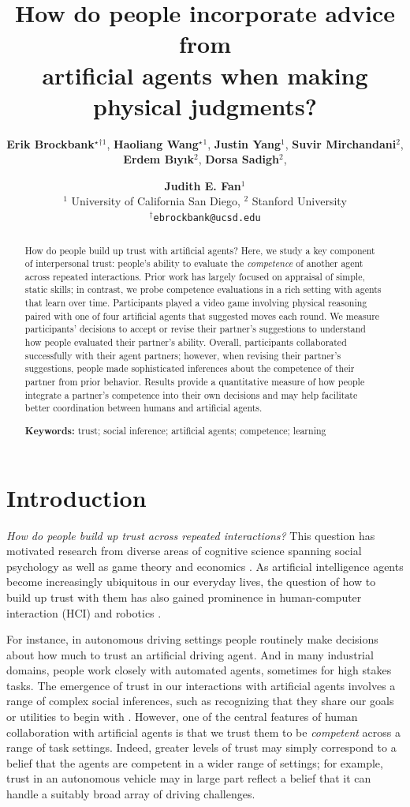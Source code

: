 \documentclass[10pt,letterpaper]{article}
\title{How do people incorporate advice from\\ artificial agents when making physical judgments?}
\author{
    {\large \bf Erik Brockbank$^{\star}$}$^{\dagger1}$, {\large \bf Haoliang Wang$^{\star}$}$^{1}$, {\large \bf Justin Yang}$^{1}$,
    {\large \bf Suvir Mirchandani}$^2$, \\
    {\large \bf Erdem B{\i}y{\i}k}$^{2}$, {\large \bf Dorsa Sadigh}$^{2}$, \and {\large \bf Judith E. Fan}$^1$ \\ 
    $^1$ University of California San Diego,
    $^2$ Stanford University \\
    $^{\dagger}$\texttt{ebrockbank@ucsd.edu}}
\begin{document}
\maketitle


\begin{abstract}
How do people build up trust with artificial agents? Here, we study a key component of interpersonal trust: people's ability to evaluate the \textit{competence} of another agent across repeated interactions. Prior work has largely focused on appraisal of simple, static skills; in contrast, we probe competence evaluations in a rich setting with agents that learn over time. Participants played a video game involving physical reasoning paired with one of four artificial agents that suggested moves each round. We measure participants' decisions to accept or revise their partner's suggestions to understand how people evaluated their partner's ability. Overall, participants collaborated successfully with their agent partners; however, when revising their partner's suggestions, people made sophisticated inferences about the competence of their partner from prior behavior. Results provide a quantitative measure of how people integrate a partner's competence into their own decisions and may help facilitate better coordination between humans and artificial agents.

\textbf{Keywords:} 
trust; social inference; artificial agents; competence; learning 
\end{abstract}



\section{Introduction}

\textit{How do people build up trust across repeated interactions?} This question has motivated research from diverse areas of cognitive science spanning social psychology \cite{simpson2007psychological, deutsch1973resolution} as well as game theory and economics \cite{camerer1988experimental, berg1995trust}. As artificial intelligence agents become increasingly ubiquitous in our everyday lives, the question of how to build up trust with them has also gained prominence in human-computer interaction (HCI) and robotics \cite{soh2020multi, chen2020trust}. 

For instance, in autonomous driving settings people routinely make decisions about how much to trust an artificial driving agent. And in many industrial domains, people work closely with automated agents, sometimes for high stakes tasks. The emergence of trust in our interactions with artificial agents involves a range of complex social inferences, such as recognizing that they share our goals or utilities to begin with \cite{serrino2019finding}. However, one of the central features of human collaboration with artificial agents is that we trust them to be \textit{competent} across a range of task settings. Indeed, greater levels of trust may simply correspond to a belief that the agents are competent in a wider range of settings; for example, trust in an autonomous vehicle may in large part reflect a belief that it can handle a suitably broad array of driving challenges.
\end{document}
